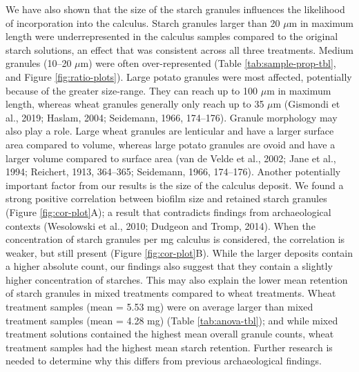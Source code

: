 \documentclass[utf8]{frontiers/frontiersSCNS}
\begin{document}
We have also shown that the size of the starch granules influences the likelihood
of incorporation into the calculus. Starch granules larger than 20 \(\mu\)m in
maximum length were underrepresented in the calculus samples compared to the original
starch solutions, an effect that was consistent across all three treatments. Medium
granules (10--20 \(\mu\)m) were often over-represented
(Table \ref{tab:sample-prop-tbl},
and
Figure \ref{fig:ratio-plots}).
Large potato granules were most affected, potentially because of the greater
size-range. They can reach up to 100 \(\mu\)m in maximum length, whereas wheat
granules generally only reach up to 35 \(\mu\)m
(Gismondi et al., 2019; Haslam, 2004; Seidemann, 1966, 174--176).
Granule morphology may also play a role. Large wheat granules
are lenticular and have a larger surface area compared
to volume, whereas large potato granules are ovoid and have a larger volume
compared to surface area
(van de Velde et al., 2002; Jane et al., 1994; Reichert, 1913, 364--365; Seidemann, 1966, 174--176).
Another potentially important factor
from our results is the size of the calculus deposit. We found a
strong positive correlation between biofilm size and retained
starch granules (Figure \ref{fig:cor-plot}A);
a result that contradicts findings from archaeological contexts
(Wesolowski et al., 2010; Dudgeon and Tromp, 2014).
When the concentration of starch granules
per mg calculus is considered, the correlation is weaker, but still present
(Figure \ref{fig:cor-plot}B).
While the larger deposits contain a higher absolute count, our findings also suggest
that they contain a slightly higher concentration of starches. This may also explain
the lower mean retention of starch granules in mixed treatments compared to
wheat treatments. Wheat treatment samples (mean = 5.53 mg) were on average larger than mixed treatment samples (mean = 4.28 mg) (Table \ref{tab:anova-tbl}); and while mixed treatment solutions contained the highest mean overall
granule counts, wheat treatment samples had the highest mean starch retention.
Further research is needed to determine why this differs from previous archaeological
findings.
\end{document}
